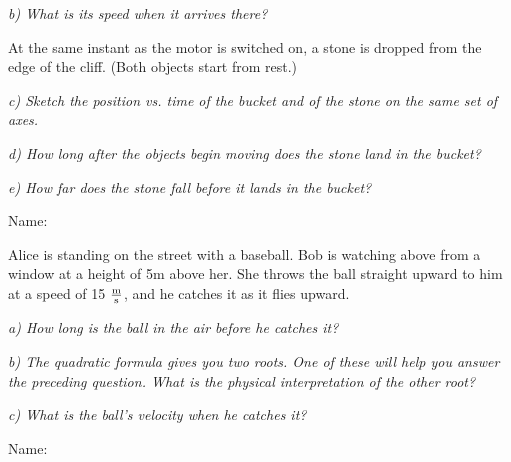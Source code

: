 \documentclass[12pt]{article}
\begin{document}
\it{b) What is its speed when it arrives there?}

\vspace{1in}

At the same instant as the motor is switched on, a stone is dropped from the edge of the cliff. (Both objects start from rest.)

\bigskip

\it{c) Sketch the position vs. time of the bucket and of the stone on the same set of axes.}

\vspace{1in}

\it{d) How long after the objects begin moving does the stone land in the bucket?}

\vspace{1in}

\it{e) How far does the stone fall before it lands in the bucket?}

\newpage

\begin{flushright}
    Name: \underline{\hspace{3in}}
  \end{flushright}

  \Large \centerline{}
  \normalsize
\rm

Alice is standing on the street with a baseball. Bob is watching above from a window at a height of 5m above her. She throws the ball straight upward to him at
a speed of 15 $\frac{\rm m}{\rm s}$, and he catches it as it flies upward.

\bigskip

\it{a) How long is the ball in the air before he catches it?}

\vspace{3in}

\it{b) The quadratic formula gives you two roots. One of these will help you answer the preceding question. What is the physical interpretation of the other root?}
\vspace{1in}

\it{c) What is the ball's velocity when he catches it?}


  \newpage

\begin{flushright}
    Name: \underline{\hspace{3in}}
  \end{flushright}

  \Large \centerline{}
  \normalsize
\rm
\end{document}
